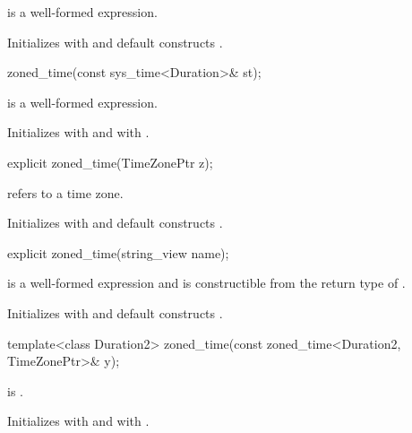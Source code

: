 \begin{itemdescr}
\pnum
\constraints
{} is a well-formed expression.

\pnum
\effects
Initializes  with  and
default constructs .
\end{itemdescr}

\begin{itemdecl}
zoned_time(const sys_time<Duration>& st);
\end{itemdecl}

\begin{itemdescr}
\pnum
\constraints
{} is a well-formed expression.

\pnum
\effects
Initializes  with  and  with .
\end{itemdescr}

\begin{itemdecl}
explicit zoned_time(TimeZonePtr z);
\end{itemdecl}

\begin{itemdescr}
\pnum
\expects
{} refers to a time zone.

\pnum
\effects
Initializes  with  and
default constructs .
\end{itemdescr}

\begin{itemdecl}
explicit zoned_time(string_view name);
\end{itemdecl}

\begin{itemdescr}
\pnum
\constraints
{} is a well-formed expression and
 is constructible from the return type of .

\pnum
\effects
Initializes  with  and
default constructs .
\end{itemdescr}

\begin{itemdecl}
template<class Duration2>
  zoned_time(const zoned_time<Duration2, TimeZonePtr>& y);
\end{itemdecl}

\begin{itemdescr}
\pnum
\constraints
{} is .

\pnum
\effects
Initializes  with  and  with .
\end{itemdescr}

